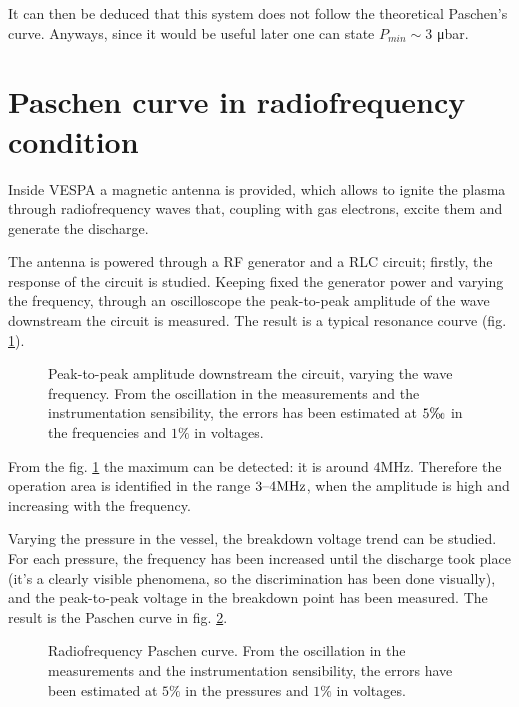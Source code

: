 \documentclass[11pt,a4 paper]{article}
\begin{document}
It can then be deduced that this system does not follow the theoretical Paschen's curve.
Anyways, since it would be useful later one can state $P_{min} \sim 3$ \si{\micro\bar}.



\section{Paschen curve in radiofrequency condition}
Inside VESPA a magnetic antenna is provided, which allows to ignite the plasma through radiofrequency waves that, coupling with gas electrons, excite them and generate the discharge.

The antenna is powered through a RF generator and a RLC circuit; firstly, the response of the circuit is studied. Keeping fixed the generator power and varying the frequency, through an oscilloscope the peak-to-peak amplitude of the wave downstream the circuit is measured. The result is a typical resonance courve (fig. \ref{fig:RF:response}).

\begin{figure}[H]
  \centering
  \caption{Peak-to-peak amplitude downstream the circuit, varying the wave frequency.  From the oscillation in the measurements and the instrumentation sensibility, the errors has been estimated at $5\tcperthousand$ in the frequencies and $1\%$ in voltages.}
  \label{fig:RF:response}
\end{figure}

From the fig. \ref{fig:RF:response} the maximum can be detected: it is around $4\si{\mega\hertz}$. Therefore the operation area is identified in the range $3\textup{--}4\si{\mega\hertz}$, when the amplitude is high and increasing with the frequency.

Varying the pressure in the vessel, the breakdown voltage trend can be studied. For each pressure, the frequency has been increased until the discharge took place (it's a clearly visible phenomena, so the discrimination has been done visually), and the peak-to-peak voltage in the breakdown point has been measured. The result is the Paschen curve in fig. \ref{fig:RF:Paschen}.

\begin{figure}[H]
  \centering
  \caption{Radiofrequency Paschen curve. From the oscillation in the measurements and the instrumentation sensibility, the errors have been estimated at $5\%$ in the pressures and $1\%$ in voltages.}
  \label{fig:RF:Paschen}
\end{figure}
\end{document}
